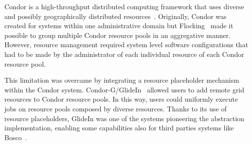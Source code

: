 \documentclass{sig-alternate}
\begin{document}

  Condor is a high-throughput distributed computing framework that uses
diverse and possibly geographically distributed resources~\cite{thain2005}.
Originally, Condor was created for systems within one administrative domain but
Flocking~\cite{Epema:1996:flocking} made it possible to group multiple Condor
resource pools in an aggregative manner. However, resource management required
system level software configurations that had to be made by the administrator of
each individual resource of each Condor resource pool.


This limitation was overcame by integrating a resource placeholder mechanism
within the Condor system. Condor-G/GlideIn~\cite{condor-g} allowed users to add
remote grid resources to Condor resource pools. In this way, users could
uniformly execute jobs on resource pools composed by diverse resources. Thanks
to its use of resource placeholders, GlideIn was one of the systems
pioneering the \pilot abstraction implementation, enabling some \pilot
capabilities also for third parties systems like Bosco~\cite{bosco}.

 
\end{document}
